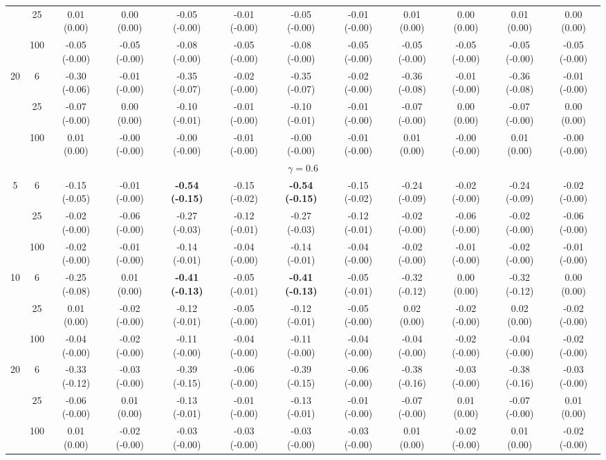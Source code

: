 \documentclass[
  man]{apa6}
\newenvironment{lltable}{\begin{landscape}\centering\begin{ThreePartTable}}{\end{ThreePartTable}\end{landscape}}
\begin{document}
\begin{lltable}
{\begin{longtable}{cccccccccccc}
 & 25 & 0.01 (0.00) & 0.00 (0.00) & -0.05 (-0.00) & -0.01 (-0.00) & -0.05 (-0.00) & -0.01 (-0.00) & 0.01 (0.00) & 0.00 (0.00) & 0.01 (0.00) & 0.00 (0.00)\\
 & 100 & -0.05 (-0.00) & -0.05 (-0.00) & -0.08 (-0.00) & -0.05 (-0.00) & -0.08 (-0.00) & -0.05 (-0.00) & -0.05 (-0.00) & -0.05 (-0.00) & -0.05 (-0.00) & -0.05 (-0.00)\\
20 & 6 & -0.30 (-0.06) & -0.01 (-0.00) & -0.35 (-0.07) & -0.02 (-0.00) & -0.35 (-0.07) & -0.02 (-0.00) & -0.36 (-0.08) & -0.01 (-0.00) & -0.36 (-0.08) & -0.01 (-0.00)\\
 & 25 & -0.07 (-0.00) & 0.00 (0.00) & -0.10 (-0.01) & -0.01 (-0.00) & -0.10 (-0.01) & -0.01 (-0.00) & -0.07 (-0.00) & 0.00 (0.00) & -0.07 (-0.00) & 0.00 (0.00)\\
 & 100 & 0.01 (0.00) & -0.00 (-0.00) & -0.00 (-0.00) & -0.01 (-0.00) & -0.00 (-0.00) & -0.01 (-0.00) & 0.01 (0.00) & -0.00 (-0.00) & 0.01 (0.00) & -0.00 (-0.00)\\
\multicolumn{12}{c}{$\gamma = 0.6$}\\
5 & 6 & -0.15 (-0.05) & -0.01 (-0.00) & \textbf{-0.54 (-0.15)} & -0.15 (-0.02) & \textbf{-0.54 (-0.15)} & -0.15 (-0.02) & -0.24 (-0.09) & -0.02 (-0.00) & -0.24 (-0.09) & -0.02 (-0.00)\\
 & 25 & -0.02 (-0.00) & -0.06 (-0.00) & -0.27 (-0.03) & -0.12 (-0.01) & -0.27 (-0.03) & -0.12 (-0.01) & -0.02 (-0.00) & -0.06 (-0.00) & -0.02 (-0.00) & -0.06 (-0.00)\\
 & 100 & -0.02 (-0.00) & -0.01 (-0.00) & -0.14 (-0.01) & -0.04 (-0.00) & -0.14 (-0.01) & -0.04 (-0.00) & -0.02 (-0.00) & -0.01 (-0.00) & -0.02 (-0.00) & -0.01 (-0.00)\\
10 & 6 & -0.25 (-0.08) & 0.01 (0.00) & \textbf{-0.41 (-0.13)} & -0.05 (-0.01) & \textbf{-0.41 (-0.13)} & -0.05 (-0.01) & -0.32 (-0.12) & 0.00 (0.00) & -0.32 (-0.12) & 0.00 (0.00)\\
 & 25 & 0.01 (0.00) & -0.02 (-0.00) & -0.12 (-0.01) & -0.05 (-0.00) & -0.12 (-0.01) & -0.05 (-0.00) & 0.02 (0.00) & -0.02 (-0.00) & 0.02 (0.00) & -0.02 (-0.00)\\
 & 100 & -0.04 (-0.00) & -0.02 (-0.00) & -0.11 (-0.00) & -0.04 (-0.00) & -0.11 (-0.00) & -0.04 (-0.00) & -0.04 (-0.00) & -0.02 (-0.00) & -0.04 (-0.00) & -0.02 (-0.00)\\
20 & 6 & -0.33 (-0.12) & -0.03 (-0.00) & -0.39 (-0.15) & -0.06 (-0.00) & -0.39 (-0.15) & -0.06 (-0.00) & -0.38 (-0.16) & -0.03 (-0.00) & -0.38 (-0.16) & -0.03 (-0.00)\\
 & 25 & -0.06 (-0.00) & 0.01 (0.00) & -0.13 (-0.01) & -0.01 (-0.00) & -0.13 (-0.01) & -0.01 (-0.00) & -0.07 (-0.00) & 0.01 (0.00) & -0.07 (-0.00) & 0.01 (0.00)\\
 & 100 & 0.01 (0.00) & -0.02 (-0.00) & -0.03 (-0.00) & -0.03 (-0.00) & -0.03 (-0.00) & -0.03 (-0.00) & 0.01 (0.00) & -0.02 (-0.00) & 0.01 (0.00) & -0.02 (-0.00)\\
\bottomrule
\end{longtable}

}

\end{lltable}
\end{document}
